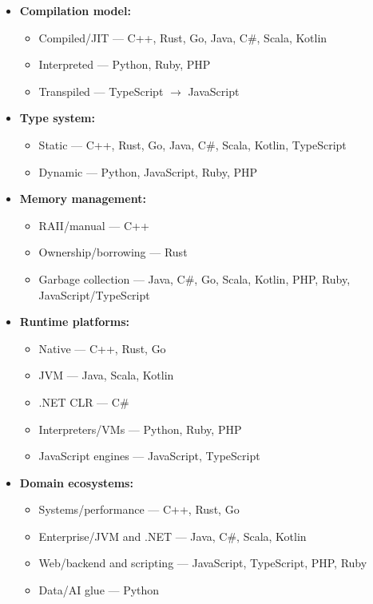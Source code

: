 \documentclass{llmxive}
\begin{document}
\begin{itemize}
    \item \textbf{Compilation model:} 
    \begin{itemize}
        \item Compiled/JIT — C++, Rust, Go, Java, C\#, Scala, Kotlin
        \item Interpreted — Python, Ruby, PHP
        \item Transpiled — TypeScript $\rightarrow$ JavaScript
    \end{itemize}
    \item \textbf{Type system:}
    \begin{itemize}
        \item Static — C++, Rust, Go, Java, C\#, Scala, Kotlin, TypeScript
        \item Dynamic — Python, JavaScript, Ruby, PHP
    \end{itemize}
    \item \textbf{Memory management:}
    \begin{itemize}
        \item RAII/manual — C++
        \item Ownership/borrowing — Rust
        \item Garbage collection — Java, C\#, Go, Scala, Kotlin, PHP, Ruby, JavaScript/TypeScript
    \end{itemize}
    \item \textbf{Runtime platforms:}
    \begin{itemize}
        \item Native — C++, Rust, Go
        \item JVM — Java, Scala, Kotlin
        \item .NET CLR — C\#
        \item Interpreters/VMs — Python, Ruby, PHP
        \item JavaScript engines — JavaScript, TypeScript
    \end{itemize}
    \item \textbf{Domain ecosystems:}
    \begin{itemize}
        \item Systems/performance — C++, Rust, Go
        \item Enterprise/JVM and .NET — Java, C\#, Scala, Kotlin
        \item Web/backend and scripting — JavaScript, TypeScript, PHP, Ruby
        \item Data/AI glue — Python
    \end{itemize}
\end{itemize}
\end{document}
